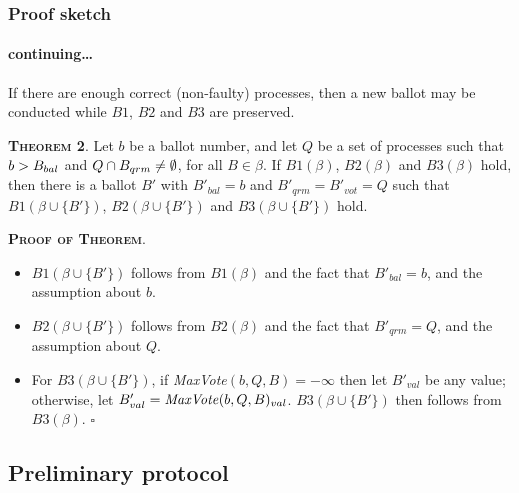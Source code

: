 \documentclass[10 pt]{beamer}
\begin{document}
\begin{frame}
\frametitle{Proof sketch}
\framesubtitle{continuing\ldots}

If there are enough correct (non-faulty) processes, then a new ballot may be conducted while $B1$, $B2$ and $B3$ are preserved.

\vspace{2 mm}
\textbf{\textsc{Theorem 2}}. Let $b$ be a ballot number, and let $Q$ be a set of processes such that $b > B_{bal}$ and $Q \cap B_{qrm} \neq \emptyset$, for all $B \in \beta$. If $B1(\beta)$, $B2(\beta)$ and $B3(\beta)$ hold, then there is a ballot $B'$ with $B'_{bal} = b$ and $B'_{qrm} = B'_{vot} = Q$ such that $B1(\beta \cup \{B'\})$, $B2(\beta \cup \{B'\})$ and $B3(\beta \cup \{B'\})$ hold.

\vspace{2 mm}
\textbf{\textsc{Proof of Theorem}}.
\begin{itemize}
\item $B1(\beta \cup \{B'\})$ follows from $B1(\beta)$ and the fact that $B'_{bal} = b$, and the assumption about $b$.
\item $B2(\beta \cup \{B'\})$ follows from $B2(\beta)$ and the fact that $B'_{qrm} = Q$, and the assumption about $Q$.
\item For $B3(\beta \cup \{B'\})$, if \textit{MaxVote}$(b,Q,B) = -\infty$ then let $B'_{val}$ be any value; otherwise, let $B'_{val} = \text{\textit{MaxVote}}(b,Q,B)_{val}$. $B3(\beta \cup \{B'\})$ then follows from $B3(\beta)$. $\square$
\end{itemize} 
\end{frame}



\subsection{Preliminary protocol}
\end{document}
